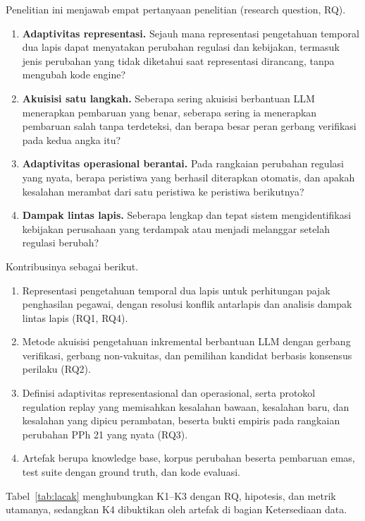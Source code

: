 \documentclass[conference]{IEEEtran}
\makeatletter
\DeclareRobustCommand{\en}[1]{{\usefont{\f@encoding}{\f@family}{\f@series}{it}#1\/}}
\makeatother
\begin{document}
Penelitian ini menjawab empat pertanyaan penelitian (\en{research question}, RQ).
\begin{enumerate}[label=\textbf{RQ\arabic*},leftmargin=*,nosep]
  \item \textbf{Adaptivitas representasi.} Sejauh mana representasi pengetahuan temporal dua lapis dapat menyatakan perubahan regulasi dan kebijakan, termasuk jenis perubahan yang tidak diketahui saat representasi dirancang, tanpa mengubah kode \en{engine}?
  \item \textbf{Akuisisi satu langkah.} Seberapa sering akuisisi berbantuan LLM menerapkan pembaruan yang benar, seberapa sering ia menerapkan pembaruan salah tanpa terdeteksi, dan berapa besar peran gerbang verifikasi pada kedua angka itu?
  \item \textbf{Adaptivitas operasional berantai.} Pada rangkaian perubahan regulasi yang nyata, berapa peristiwa yang berhasil diterapkan otomatis, dan apakah kesalahan merambat dari satu peristiwa ke peristiwa berikutnya?
  \item \textbf{Dampak lintas lapis.} Seberapa lengkap dan tepat sistem mengidentifikasi kebijakan perusahaan yang terdampak atau menjadi melanggar setelah regulasi berubah?
\end{enumerate}

Kontribusinya sebagai berikut.
\begin{enumerate}[label=\textbf{K\arabic*},leftmargin=*,nosep]
  \item Representasi pengetahuan temporal dua lapis untuk perhitungan pajak penghasilan pegawai, dengan resolusi konflik antarlapis dan analisis dampak lintas lapis (RQ1, RQ4).
  \item Metode akuisisi pengetahuan inkremental berbantuan LLM dengan gerbang verifikasi, gerbang non-vakuitas, dan pemilihan kandidat berbasis konsensus perilaku (RQ2).
  \item Definisi adaptivitas representasional dan operasional, serta protokol \en{regulation replay} yang memisahkan kesalahan bawaan, kesalahan baru, dan kesalahan yang dipicu perambatan, beserta bukti empiris pada rangkaian perubahan PPh 21 yang nyata (RQ3).
  \item Artefak berupa \en{knowledge base}, korpus perubahan beserta pembaruan emas, \en{test suite} dengan \en{ground truth}, dan kode evaluasi.
\end{enumerate}
Tabel~\ref{tab:lacak} menghubungkan K1--K3 dengan RQ, hipotesis, dan metrik utamanya, sedangkan K4 dibuktikan oleh artefak di bagian Ketersediaan data.
\end{document}
